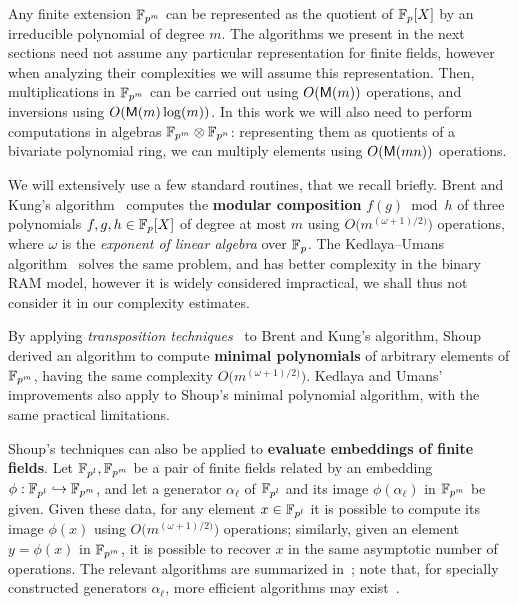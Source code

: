 \documentclass{sig-alternate}
\begin{document}
Any finite extension $\mathbb{F}_{p^m}$ can be represented as the quotient of
$\mathbb{F}_p[X]$ by an irreducible polynomial of degree $m$. %
The algorithms we present in the next sections need not assume any
particular representation for finite fields, however when analyzing
their complexities we will assume this representation. %
Then, multiplications in $\mathbb{F}_{p^m}$ can be carried out using
$O(\mathsf{M}(m))$ operations, and inversions using $O(\mathsf{M}(m)\log(m))$. %
In this work we will also need to perform computations in algebras
$\mathbb{F}_{p^m}\otimes\mathbb{F}_{p^n}$: representing them as quotients of a
bivariate polynomial ring, we can multiply elements using $O(\mathsf{M}(mn))$
operations.

We will extensively use a few standard routines, that we recall
briefly. %
Brent and Kung's algorithm~\cite{brent+kung} computes the
\textbf{modular composition} $f(g)\bmod h$ of three polynomials
$f,g,h\in\mathbb{F}_p[X]$ of degree at most $m$ using
$O\bigl(m^{(\omega+1)/2)}\bigr)$ operations, where $\omega$ is the
\emph{exponent of linear algebra} over $\mathbb{F}_p$. %
The Kedlaya--Umans algorithm~\cite{KeUm11} solves the same problem,
and has better complexity in the binary RAM model, however it is
widely considered impractical, we shall thus not consider it in our
complexity estimates.

By applying \emph{transposition
  techniques}~\cite{burgisser+clausen-shokrollahi,bostan+lecerf+schost:tellegen}
to Brent and Kung's algorithm, Shoup~\cite{shoup94,shoup99} derived an
algorithm to compute \textbf{minimal polynomials} of arbitrary
elements of $\mathbb{F}_{p^m}$, having the same complexity
$O\bigl(m^{(\omega+1)/2)}\bigr)$. %
Kedlaya and Umans' improvements also apply to Shoup's minimal
polynomial algorithm, with the same practical limitations.

Shoup's techniques can also be applied to \textbf{evaluate embeddings
  of finite fields}. %
Let $\mathbb{F}_{p^l},\mathbb{F}_{p^m}$ be a pair of finite fields related by an
embedding $\phi:\mathbb{F}_{p^l}\hookrightarrow\mathbb{F}_{p^m}$, and let a
generator $\alpha_\ell$ of $\mathbb{F}_{p^l}$ and its image
$\phi(\alpha_\ell)$ in $\mathbb{F}_{p^m}$ be given. %
Given these data, for any element $x\in\mathbb{F}_{p^l}$ it is possible to
compute its image $\phi(x)$ using $O\bigl(m^{(\omega+1)/2)}\bigr)$
operations; similarly, given an element $y=\phi(x)$ in $\mathbb{F}_{p^m}$, it
is possible to recover $x$ in the same asymptotic number of
operations. %
The relevant algorithms are summarized in~\cite[Sec.~6]{ffisom-long};
note that, for specially constructed generators $\alpha_\ell$, more
efficient algorithms may
exist~\cite{df+schost12,DoSc12,DeDoSc13,DeDoSc2014}.
\end{document}
